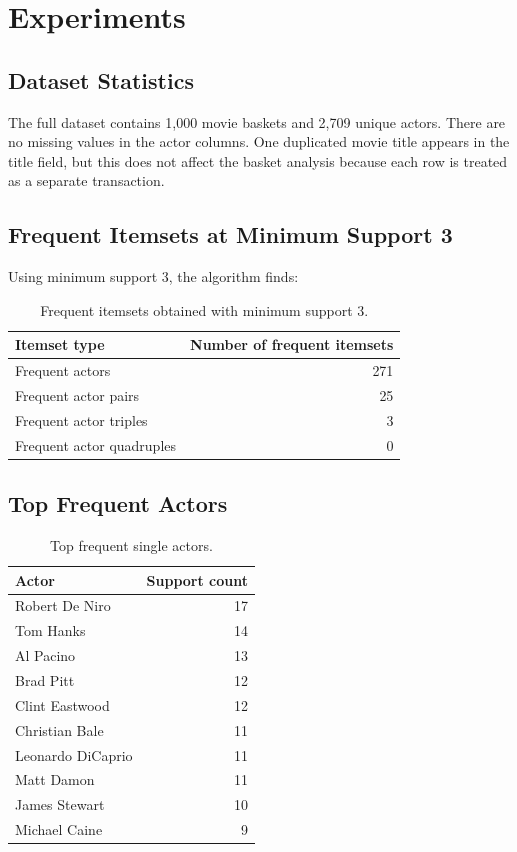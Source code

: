 \documentclass[11pt,a4paper]{article}
\begin{document}
\section{Experiments}

\subsection{Dataset Statistics}
The full dataset contains 1,000 movie baskets and 2,709 unique actors. There are no missing values in the actor columns. One duplicated movie title appears in the title field, but this does not affect the basket analysis because each row is treated as a separate transaction.

\subsection{Frequent Itemsets at Minimum Support 3}
Using minimum support 3, the algorithm finds:
\begin{table}[H]
\centering
\begin{tabular}{lr}
\toprule
Itemset type & Number of frequent itemsets \\
\midrule
Frequent actors & 271 \\
Frequent actor pairs & 25 \\
Frequent actor triples & 3 \\
Frequent actor quadruples & 0 \\
\bottomrule
\end{tabular}
\caption{Frequent itemsets obtained with minimum support 3.}
\end{table}

\subsection{Top Frequent Actors}
\begin{table}[H]
\centering
\begin{tabular}{lr}
\toprule
Actor & Support count \\
\midrule
Robert De Niro & 17 \\
Tom Hanks & 14 \\
Al Pacino & 13 \\
Brad Pitt & 12 \\
Clint Eastwood & 12 \\
Christian Bale & 11 \\
Leonardo DiCaprio & 11 \\
Matt Damon & 11 \\
James Stewart & 10 \\
Michael Caine & 9 \\
\bottomrule
\end{tabular}
\caption{Top frequent single actors.}
\end{table}
\end{document}

